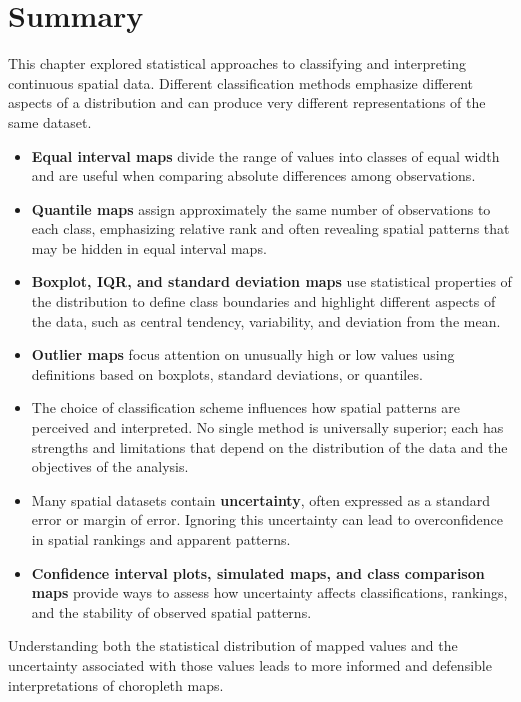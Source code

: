 \documentclass[
  letterpaper,
]{book}
\providecommand{\tightlist}{%
  \setlength{\itemsep}{0pt}\setlength{\parskip}{0pt}}
\begin{document}
\section{Summary}\label{summary-3}

This chapter explored statistical approaches to classifying and
interpreting continuous spatial data. Different classification methods
emphasize different aspects of a distribution and can produce very
different representations of the same dataset.

\begin{itemize}
\tightlist
\item
  \textbf{Equal interval maps} divide the range of values into classes
  of equal width and are useful when comparing absolute differences
  among observations.
\item
  \textbf{Quantile maps} assign approximately the same number of
  observations to each class, emphasizing relative rank and often
  revealing spatial patterns that may be hidden in equal interval maps.
\item
  \textbf{Boxplot, IQR, and standard deviation maps} use statistical
  properties of the distribution to define class boundaries and
  highlight different aspects of the data, such as central tendency,
  variability, and deviation from the mean.
\item
  \textbf{Outlier maps} focus attention on unusually high or low values
  using definitions based on boxplots, standard deviations, or
  quantiles.
\item
  The choice of classification scheme influences how spatial patterns
  are perceived and interpreted. No single method is universally
  superior; each has strengths and limitations that depend on the
  distribution of the data and the objectives of the analysis.
\item
  Many spatial datasets contain \textbf{uncertainty}, often expressed as
  a standard error or margin of error. Ignoring this uncertainty can
  lead to overconfidence in spatial rankings and apparent patterns.
\item
  \textbf{Confidence interval plots, simulated maps, and class
  comparison maps} provide ways to assess how uncertainty affects
  classifications, rankings, and the stability of observed spatial
  patterns.
\end{itemize}

Understanding both the statistical distribution of mapped values and the
uncertainty associated with those values leads to more informed and
defensible interpretations of choropleth maps.
\end{document}
